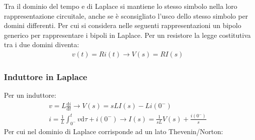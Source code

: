 \documentclass{article}
\newcommand{\df}{\mathrm{d}}
\numberwithin{equation}{subsection}
\begin{document}
Tra il dominio del tempo e di Laplace si mantiene lo stesso simbolo nella loro rappresentazione circuitale, anche se è sconsigliato l'usco dello 
stesso simbolo per domini differenti. Per cui si considera nelle seguenti rappresentazioni un bipolo generico per rappresentare i bipoli in Laplace. Per un resistore la legge costitutiva tra i due domini diventa:
\begin{gather}
    v(t)=Ri(t)\to V(s)=RI(s)
\end{gather}
\begin{figure}[H]%
    \centering
    \qquad
    \label{fig:resistore-tempo-laplace}
\end{figure}

\subsubsection{Induttore in Laplace}
Per un induttore:
\begin{gather}
    v=\displaystyle L\frac{\df i}{\df t}\to V(s)=sLI(s)-Li(0^-)\\
    i=\displaystyle\frac{1}{L}\int_{0^-}^tv\df\tau+i(0^-)\to I(s)=\frac{1}{sL}V(s)+\frac{i(0^-)}{s}
\end{gather}
Per cui nel dominio di Laplace corrisponde ad un lato Thevenin/Norton:
\end{document}
